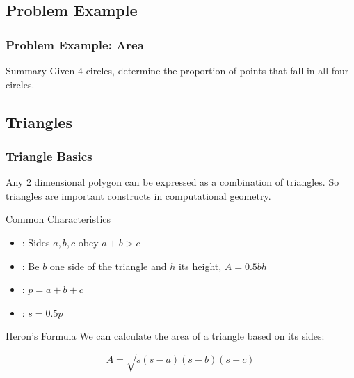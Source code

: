 \documentclass{beamer}
\begin{document}
\subsection{Problem Example}
\begin{frame}
  \frametitle{Problem Example: Area}

  \begin{block}{Summary}
    Given 4 circles, determine the proportion of points that fall in all four circles.
  \end{block}
  
\end{frame}



\subsection{Triangles}
\begin{frame}
  \frametitle{Triangle Basics}
  {\smaller
    Any 2 dimensional polygon can be expressed as a combination of
    triangles. So triangles are important constructs in computational
    geometry.

    \begin{block}{Common Characteristics}
      \begin{itemize}
      \item {}: Sides $a,b,c$ obey $a+b > c$
      \item {}: Be $b$ one side of the triangle
        and $h$ its height, $A=0.5bh$
      \item {}: $p=a+b+c$
      \item {}: $s = 0.5p$
      \end{itemize}
    \end{block}

    \begin{block}{Heron's Formula}
      We can calculate the area of a triangle based on its sides:

      \begin{equation*}
        A = \sqrt{s(s-a)(s-b)(s-c)}
      \end{equation*}
    \end{block}


  }
\end{frame}

\end{document}
